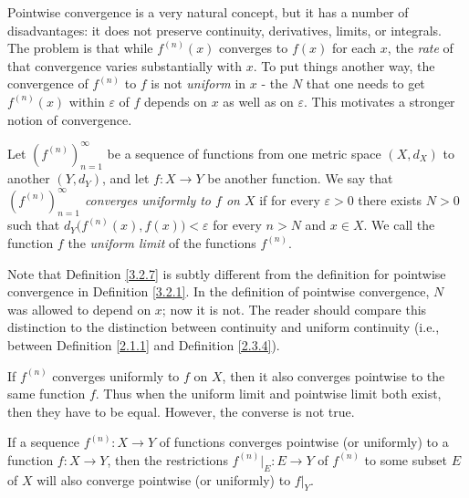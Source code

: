 \begin{note}
    Pointwise convergence is a very natural concept, but it has a number of disadvantages:
    it does not preserve continuity, derivatives, limits, or integrals.
    The problem is that while \(f^{(n)}(x)\) converges to \(f(x)\) for each \(x\), the \emph{rate} of that convergence varies substantially with \(x\).
    To put things another way, the convergence of \(f^{(n)}\) to \(f\) is not \emph{uniform} in \(x\)
    - the \(N\) that one needs to get \(f^{(n)}(x)\) within \(\varepsilon\) of \(f\) depends on \(x\) as well as on \(\varepsilon\).
    This motivates a stronger notion of convergence.
\end{note}

\setcounter{theorem}{6}
\begin{definition}\label{3.2.7}
    Let \((f^{(n)})_{n = 1}^\infty\) be a sequence of functions from one metric space \((X, d_X)\) to another \((Y, d_Y)\), and let \(f : X \to Y\) be another function.
    We say that \emph{\((f^{(n)})_{n = 1}^\infty\) converges uniformly to \(f\) on \(X\)} if for every \(\varepsilon > 0\) there exists \(N > 0\) such that \(d_Y\big(f^{(n)}(x), f(x)\big) < \varepsilon\) for every \(n > N\) and \(x \in X\).
    We call the function \(f\) the \emph{uniform limit} of the functions \(f^{(n)}\).
\end{definition}

\begin{remark}\label{3.2.8}
    Note that Definition \ref{3.2.7} is subtly different from the definition for pointwise convergence in Definition \ref{3.2.1}.
    In the definition of pointwise convergence, \(N\) was allowed to depend on \(x\);
    now it is not.
    The reader should compare this distinction to the distinction between continuity and uniform continuity
    (i.e., between Definition \ref{2.1.1} and Definition \ref{2.3.4}).
\end{remark}

\begin{note}
    If \(f^{(n)}\) converges uniformly to \(f\) on \(X\), then it also converges pointwise to the same function \(f\).
    Thus when the uniform limit and pointwise limit both exist, then they have to be equal.
    However, the converse is not true.
\end{note}

\begin{note}
    If a sequence \(f^{(n)} : X \to Y\) of functions converges pointwise (or uniformly) to a function \(f : X \to Y\), then the restrictions \(f^{(n)}|_E : E \to Y\) of \(f^{(n)}\) to some subset \(E\) of \(X\) will also converge pointwise (or uniformly) to \(f|_Y\).
\end{note}

